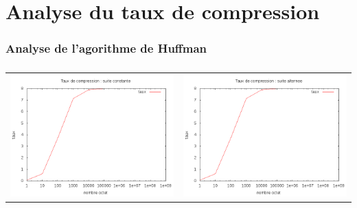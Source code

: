 \documentclass{report}
\begin{document}
\section*{Analyse du taux de compression}
\subsubsection{ Analyse de l'agorithme de Huffman}

\subparagraph*{}
\hspace{-2cm}\begin{tabular}{l | l}
\includegraphics[width=7cm]{HConstant.png} & 
\includegraphics[width=7cm]{alternerH.png}
\end{tabular}
\end{document}
